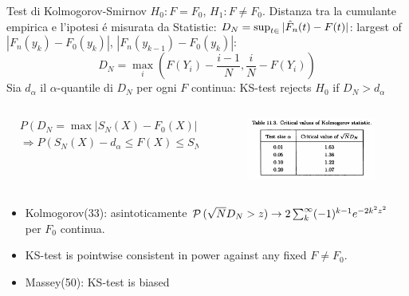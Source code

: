\documentclass[asd-beamer.tex]{subfiles}
\begin{document}
\begin{frame}{Test di Kolmogorov-Smirnov}
$H_0: F=F_0$, $H_1: F\neq F_0$. Distanza tra la cumulante empirica e l'ipotesi \'e misurata da Statistic: $D_N=\sup_{t\in\real}{|\hat{F}_n(t)-F(t)|}$: largest of $|F_n(y_k)-F_0(y_k)|$, $|F_n(y_{k-1})-F_0(y_k)|$:
\[D_N=\max_{i}(F(Y_i)-\frac{i-1}{N},\frac{i}{N}-F(Y_i))\]
Sia $d_{\alpha}$ il $\alpha$-quantile di $D_N$ per ogni $F$ continua: KS-test rejects $H_0$ if $D_N>d_{\alpha}$
\begin{columns}[T]
\begin{column}{0.7\textwidth}
\begin{align*}
&P(D_N=\max|S_N(X)-F_0(X)|>d_{\alpha})=1-\alpha\\
&\Rightarrow P(S_N(X)-d_{\alpha}\leq F(X)\leq S_N(X)+d_{\alpha})=1-\alpha
\end{align*}
\end{column}
\begin{column}{0.3\textwidth}
\begin{figure}[!ht]\includegraphics[trim={0cm 0cm 0 0},clip, keepaspectratio,width=0.99\textwidth]{figures/james/test/gof-kolmogo-critical}\label{fig:gof-kolmogo-critical}
	\end{figure}
\end{column}
\end{columns}
\begin{itemize}
\item Kolmogorov(33): asintoticamente 
$\operatorname{\mathcal{P}}{(\sqrt{N}D_N>z)}\to2\sum_k^{\infty}(-1)^{k-1}e^{-2k^2z^2}$ per $F_0$ continua.
\item KS-test is pointwise consistent in power against any fixed $F\neq F_0$. %
\item Massey(50): KS-test is biased
\end{itemize}
\end{frame}
\end{document}

